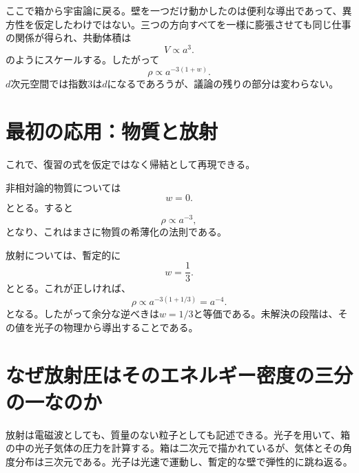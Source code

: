 ここで箱から宇宙論に戻る。壁を一つだけ動かしたのは便利な導出であって、異方性を仮定したわけではない。三つの方向すべてを一様に膨張させても同じ仕事の関係が得られ、共動体積は
\begin{equation}
V\propto a^3.
\end{equation}
のようにスケールする。したがって
\begin{equation}
\boxed{\rho\propto a^{-3(1+w)}}.
\label{eq:c05-density-scaling}
\end{equation}
\(d\)次元空間では指数\(3\)は\(d\)になるであろうが、議論の残りの部分は変わらない。

\section{最初の応用：物質と放射}

これで、復習の式を仮定ではなく帰結として再現できる。

非相対論的物質については
\begin{equation}
w=0.
\end{equation}
ととる。すると
\begin{equation}
\rho\propto a^{-3},
\end{equation}
となり、これはまさに物質の希薄化の法則である。

放射については、暫定的に
\begin{equation}
w=\frac13.
\end{equation}
ととる。これが正しければ、
\begin{equation}
\rho\propto a^{-3(1+1/3)}=a^{-4}.
\end{equation}
となる。したがって余分な逆べきは\(w=1/3\)と等価である。未解決の段階は、その値を光子の物理から導出することである。

\section{なぜ放射圧はそのエネルギー密度の三分の一なのか}

放射は電磁波としても、質量のない粒子としても記述できる。光子を用いて、箱の中の光子気体の圧力を計算する。箱は二次元で描かれているが、気体とその角度分布は三次元である。光子は光速で運動し、暫定的な壁で弾性的に跳ね返る。

